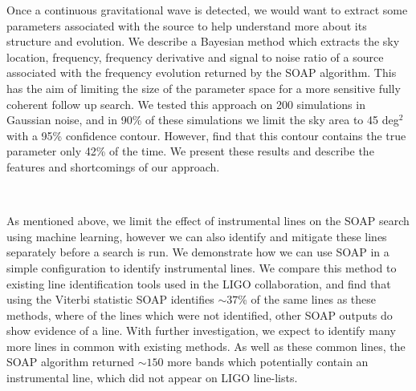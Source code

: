 Once a continuous gravitational wave is detected, we would want to extract some
parameters associated with the source to help understand more about its
structure and evolution. We describe a Bayesian method which extracts the sky
location, frequency, frequency derivative and signal to noise ratio of a source associated with the
frequency evolution returned by the SOAP algorithm.  This has the aim of
limiting the size of the parameter space for a more sensitive fully coherent
follow up search.  
We tested this approach on 200 simulations in Gaussian noise, and in 90\% of these simulations we limit the sky area to 45 deg$^2$ with a 95\% confidence contour.
However, find that this contour contains the true parameter only 42\% of the time.
We present these results and describe the features and shortcomings of our approach.

~

As mentioned above, we limit the effect of instrumental lines on the SOAP
search using machine learning, however we can also identify and mitigate these
lines separately before a search is run.  We demonstrate how we can use SOAP in
a simple configuration to identify instrumental lines.  We compare this method
to existing line identification tools used in the \gls{LIGO} collaboration, and
find that using the Viterbi statistic SOAP identifies $\sim 37$\% of the same lines as these methods, where of the lines which were not identified, other SOAP outputs do show evidence of a line.
With further investigation, we expect to identify many more lines in common with existing methods.
As well as these common lines, the SOAP algorithm returned $\sim 150$ more bands which potentially contain an instrumental line, which did not appear on \gls{LIGO} line-lists.








